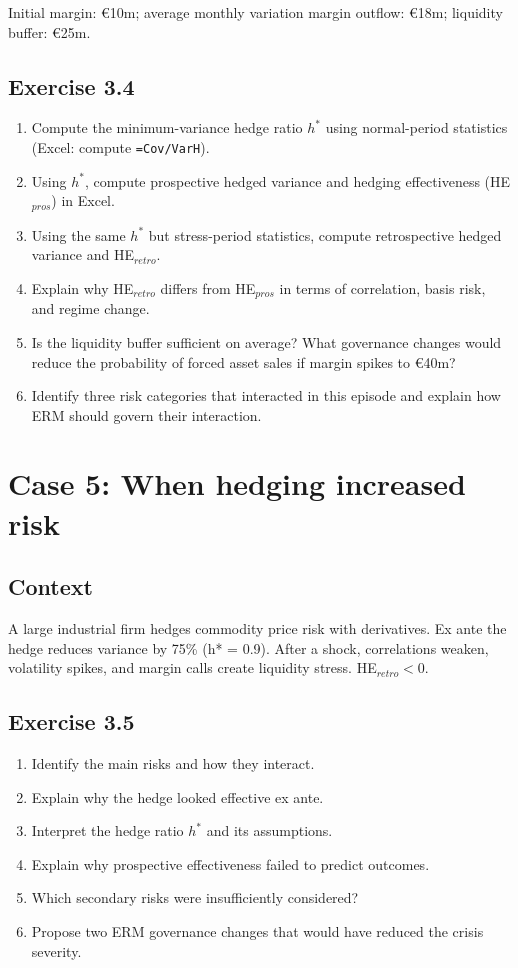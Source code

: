 \documentclass[11pt]{article}
\begin{document}
Initial margin: \euro 10m; average monthly variation margin outflow: \euro 18m; liquidity buffer: \euro 25m.

\subsection*{Exercise 3.4}
\begin{enumerate}
  \item Compute the minimum-variance hedge ratio $h^*$ using normal-period statistics (Excel: compute \texttt{=Cov/VarH}).
  \item Using $h^*$, compute prospective hedged variance and hedging effectiveness (HE$_{pros}$) in Excel.
  \item Using the same $h^*$ but stress-period statistics, compute retrospective hedged variance and HE$_{retro}$.
  \item Explain why HE$_{retro}$ differs from HE$_{pros}$ in terms of correlation, basis risk, and regime change.
  \item Is the liquidity buffer sufficient on average? What governance changes would reduce the probability of forced asset sales if margin spikes to \euro 40m?
  \item Identify three risk categories that interacted in this episode and explain how ERM should govern their interaction.
\end{enumerate}

\newpage
\section{Case 5: When hedging increased risk}
\subsection*{Context}
A large industrial firm hedges commodity price risk with derivatives. Ex ante the hedge reduces variance by 75\% (h* = 0.9). After a shock, correlations weaken, volatility spikes, and margin calls create liquidity stress. HE$_{retro} < 0$.

\subsection*{Exercise 3.5}
\begin{enumerate}
  \item Identify the main risks and how they interact.
  \item Explain why the hedge looked effective ex ante.
  \item Interpret the hedge ratio $h^*$ and its assumptions.
  \item Explain why prospective effectiveness failed to predict outcomes.
  \item Which secondary risks were insufficiently considered?
  \item Propose two ERM governance changes that would have reduced the crisis severity.
\end{enumerate}
\end{document}
